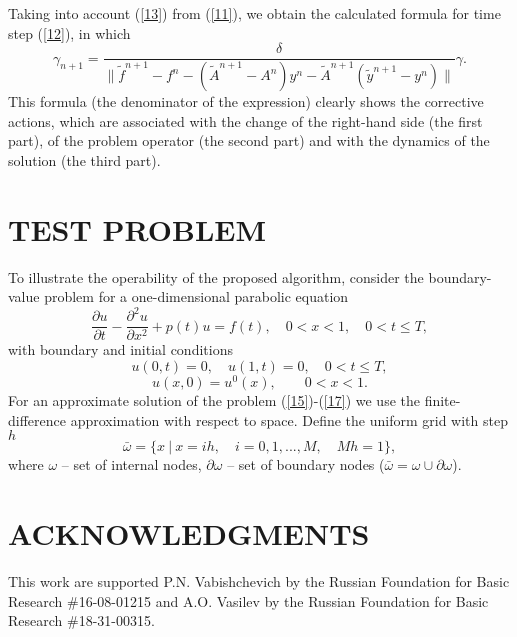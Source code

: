 \documentclass{aip-cp}
\begin{document}
Taking into account (\ref{13})  from (\ref{11}), we obtain the calculated formula for time step (\ref{12}), in which
\begin{equation}\label{14}
  \gamma_{n+1} = \frac{\delta}{ \|\widetilde{f}^{n+1} - f^n  -
  (\widetilde{A}^{n+1} - A^n) y^n  -
  \widetilde{A}^{n+1} (\widetilde{y}^{n+1} - y^n) \| } \gamma .
\end{equation} 
This formula (the denominator of the expression) clearly shows the corrective actions, which are associated with the change of the right-hand side (the first part), of the problem operator (the second part) and with the dynamics of the solution (the third part).

\section{TEST PROBLEM}
To illustrate the operability of the proposed algorithm, consider the boundary-value problem for a one-dimensional parabolic equation
\begin{equation}\label{15}
  \frac{\partial u}{\partial t} - \frac{\partial^2 u}{\partial x^2} + p(t) u = f(t),
  \quad 0 < x < 1,
  \quad 0 < t \leq  T ,  
\end{equation}
with boundary and initial conditions
\begin{equation}\label{16}
  u(0, t) = 0,
  \quad u(1,t) = 0,
  \quad 0 < t \leq  T , 
\end{equation}
\begin{equation}\label{17}
  u(x,0) = u^0(x),
  \quad  \quad 0 <  x <  1 .
\end{equation}
For an approximate solution of the problem (\ref{15})-(\ref{17}) we use the finite-difference approximation with respect to space. Define the uniform grid with step $h$
\[
  \bar{\omega} = \{ x \ | \ x = ih, \quad i = 0, 1, ..., M, \quad Mh = 1 \},  
\] 
where $\omega$ -- set of internal nodes, $\partial\omega$ -- set of boundary nodes ($\bar{\omega } = \omega \cup \partial \omega$).
\section{ACKNOWLEDGMENTS}
This work are supported P.N. Vabishchevich by the Russian Foundation for Basic Research \#16-08-01215 and A.O. Vasilev by the Russian Foundation for Basic Research \#18-31-00315.


\nocite{*}
%
%
\end{document}
